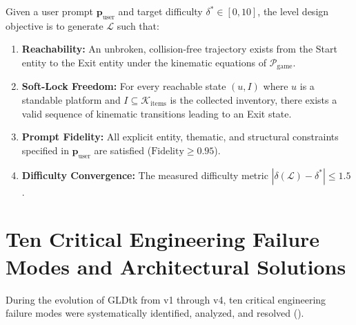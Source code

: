 \documentclass[11pt,a4paper]{report}
\theoremstyle{definition}
\theoremstyle{remark}
\begin{document}
Given a user prompt $\mathbf{p}_{\text{user}}$ and target difficulty $\delta^* \in [0, 10]$, the level design objective is to generate $\mathcal{L}$ such that:
\begin{enumerate}
    \item \textbf{Reachability:} An unbroken, collision-free trajectory exists from the Start entity to the Exit entity under the kinematic equations of $\mathcal{P}_{\text{game}}$.
    \item \textbf{Soft-Lock Freedom:} For every reachable state $(u, I)$ where $u$ is a standable platform and $I \subseteq \mathcal{K}_{\text{items}}$ is the collected inventory, there exists a valid sequence of kinematic transitions leading to an Exit state.
    \item \textbf{Prompt Fidelity:} All explicit entity, thematic, and structural constraints specified in $\mathbf{p}_{\text{user}}$ are satisfied ($\text{Fidelity} \ge 0.95$).
    \item \textbf{Difficulty Convergence:} The measured difficulty metric $|\delta(\mathcal{L}) - \delta^*| \le 1.5$.
\end{enumerate}

\section{Ten Critical Engineering Failure Modes and Architectural Solutions}
During the evolution of GLDtk from v1 through v4, ten critical engineering failure modes were systematically identified, analyzed, and resolved ().
\end{document}
